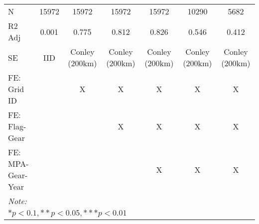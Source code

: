 \begin{table}
\begin{tabular}[t]{lcccccc}
\hspace{1em}N & 15972 & 15972 & 15972 & 15972 & 10290 & 5682\\
\hspace{1em}R2 Adj & 0.001 & 0.775 & 0.812 & 0.826 & 0.546 & 0.412\\
\hspace{1em}SE & IID & Conley (200km) & Conley (200km) & Conley (200km) & Conley (200km) & Conley (200km)\\
\midrule
FE: Grid ID &  & X & X & X & X & X\\
FE: Flag-Gear &  &  & X & X & X & X\\
FE: MPA-Gear-Year &  &  &  & X & X & X\\
\midrule
\bottomrule
\multicolumn{7}{l}{\rule{0pt}{1em}\textit{Note: }}\\
\multicolumn{7}{l}{\rule{0pt}{1em}$* p < 0.1, ** p < 0.05, *** p < 0.01$}\\
\end{tabular}
\end{table}
